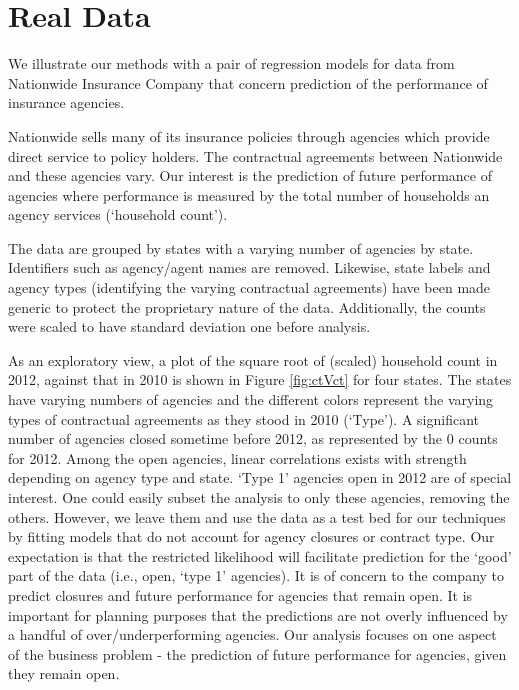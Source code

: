 \documentclass[ba]{imsart}
\newcommand{\response}[1]{{\color{blue}#1}}
\begin{document}
%
%
\section{Real Data}
\label{RealData}
We illustrate our methods with a pair of regression models for data from Nationwide Insurance Company that concern prediction of the performance of insurance agencies.

%
Nationwide sells many of its insurance policies through agencies which provide direct service to policy holders.  The contractual agreements between Nationwide and these agencies vary.  Our interest is the prediction of future performance of agencies where  performance is measured by the total number of households an agency services (`household count'). 
 
The data are grouped by states with a varying number of agencies by state. Identifiers such as agency/agent names are removed. Likewise, state labels and agency types (identifying the varying contractual agreements) have been made generic to protect the proprietary nature of the data. Additionally, the counts were scaled to have standard deviation one before analysis. 

As an exploratory view, a plot of the square root of (scaled) household count in 2012, against that in 2010 
is shown in Figure \ref{fig:ctVct} for four states. The states have varying numbers of agencies and  the different colors represent the varying types of contractual agreements as they stood in 2010 (`Type').  A significant number of agencies closed sometime before 2012, as represented by the $0$ counts for 2012. Among the open agencies, linear correlations exists with strength depending on agency type and state.  `Type 1' agencies open in 2012 are of special interest.  One could easily subset the analysis to only these agencies, removing the others. However,  we leave them and use the data as a test bed for our techniques by fitting models that do not account for agency closures or contract type.  Our expectation is that the restricted likelihood will facilitate prediction for the `good' part of the data (i.e., open, `type 1' agencies).  \response{It is of concern to the company to predict closures and future performance for agencies that remain open. It is important for planning purposes that the predictions are not overly influenced by a handful of over/underperforming agencies. Our analysis focuses on one aspect of the business problem - the prediction of future performance for agencies, given they remain open.}  
\end{document}
